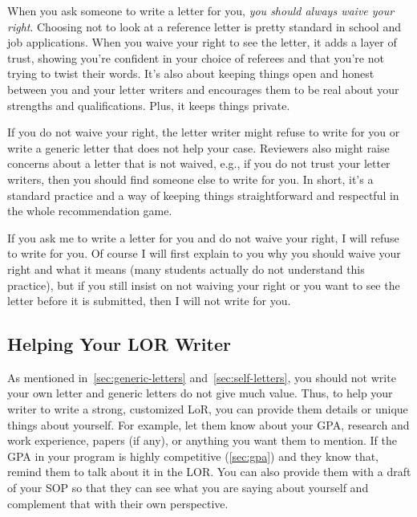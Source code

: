 \documentclass[oneside,11pt]{book}
\newenvironment{warningbox}[1][]{
  \small
  \begin{marker}[\faChessKing{}]
    {\textbf{#1}}
  }{
  \end{marker}
}
\begin{document}
When you ask someone to write a letter for you, \emph{you should always waive your right}.
Choosing not to look at a reference letter is pretty standard in school and job applications. When you waive your right to see the letter, it adds a layer of trust, showing you're confident in your choice of referees and that you're not trying to twist their words. It's also about keeping things open and honest between you and your letter writers and encourages them to be real about your strengths and qualifications. Plus, it keeps things private.

If you do not waive your right,  the letter writer might refuse to write for you or write a generic letter that does not help your case.  Reviewers also might raise concerns about a letter that is not waived, e.g., if you do not trust your letter writers, then you should find someone else to write for you. In short, it's a standard practice and a way of keeping things straightforward and respectful in the whole recommendation game.

\begin{warningbox}
If you ask me to write a letter for you and do not waive your right, I will refuse to write for you. Of course I will first explain to you why you should waive your right and what it means (many students actually do not understand this practice), but if you still insist on not waiving your right or you want to see the letter before it is submitted, then I will not write for you. 
\end{warningbox}
  

\subsection{Helping Your LOR Writer}\label{sec:help-your-LOR-writers}

 As mentioned in~\autoref{sec:generic-letters} and~\autoref{sec:self-letters}, you should not write your own letter and generic letters do not give much value. Thus, to help your writer to write a strong, customized LoR, you can provide them details or unique things about yourself. For example, let them know about your GPA, research and work experience, papers (if any), or anything you want them to mention.  If the GPA in your program is highly competitive (\autoref{sec:gpa}) and they know that, remind them to talk about it in the LOR. 
You can also provide them with a draft of your SOP so that they can see what you are saying about yourself and complement that with their own perspective.
\end{document}
